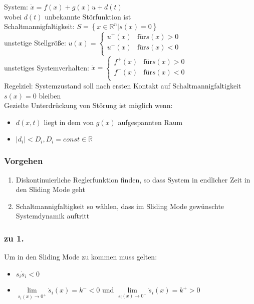 \documentclass[6pt,a4paper,fleqn]{scrartcl}
\begin{document}
\begin{multicols*}{4}
System: $\dot{x} = f(x) + g(x)u + d(t)$ \\
wobei $d(t)$ unbekannte Störfunktion ist \\
Schaltmannigfaltigkeit: $S = \left\{ x \in \mathbb{R}^n | s(x) = 0 \right\}$ \\
unstetige Stellgröße:
$u(x) =
\begin{cases}
  u^+(x) & \text{für} s(x) > 0 \\
  u^-(x) & \text{für} s(x) < 0 \\
\end{cases}$\\
unstetiges Systemverhalten:
$\dot{x} =
\begin{cases}
  f^+(x) & \text{für} s(x) > 0 \\
  f^-(x) & \text{für} s(x) < 0 \\
\end{cases}$\\
Regelziel: Systemzustand soll nach ersten Kontakt auf Schaltmannigfaltigkeit $s(x) = 0$ bleiben\\
Gezielte Unterdrückung von Störung ist möglich wenn:
\begin{itemize}
  \item $d(x,t)$ liegt in dem von $g(x)$ aufgespannten Raum
  \item $|d_i| < D_i, D_i = const \in \mathbb{R}$
\end{itemize}

\subsubsection*{Vorgehen}
\begin{enumerate}
  \item Diskontinuierliche Reglerfunktion finden, so dass System in endlicher Zeit in den Sliding Mode geht
  \item Schaltmannigfaltigkeit so wählen, dass im Sliding Mode gewünschte Systemdynamik auftritt
\end{enumerate}

\subsubsection*{zu 1.}
Um in den Sliding Mode zu kommen muss gelten: 
\begin{itemize}
  \item $s_i \dot{s}_i < 0$
  \item $\lim\limits_{s_i(x) \rightarrow 0^+} \dot{s}_i(x) = k^- < 0$ und $\lim\limits_{s_i(x) \rightarrow 0^-} \dot{s}_i(x) = k^+ > 0$
\end{itemize}


\end{multicols*}
\end{document}
